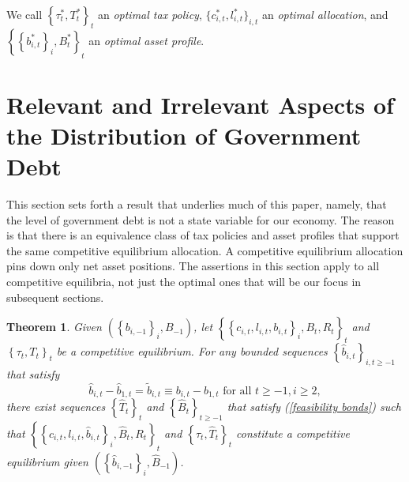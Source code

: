 \documentclass[thmsb,11pt]{article}
\newtheorem{theorem}{Theorem}
\begin{document}
\smallskip We  call $\left \{ \tau _{t}^{\ast },T_{t}^{\ast }\right \}
_{t}$ an \textit{optimal tax policy}, $\{c_{i,t}^{\ast },l_{i,t}^{\ast
}\}_{i,t}$ an \textit{optimal allocation}, and $\left \{ \left \{
b_{i,t}^{\ast }\right \} _{i},B_{t}^{\ast }\right \} _{t}$ an \textit{%
optimal asset profile}.

\section{\protect\smallskip Relevant and Irrelevant Aspects of  the Distribution of Government Debt\label{sec:Ricardian101}}
%
This section sets forth  a  result that underlies much of this paper, namely, that  the level
of government debt is not a state variable for our economy.  The reason is that there is an equivalence class of tax policies and asset profiles that support the same competitive equilibrium allocation.
A competitive  equilibrium allocation pins down only net asset  positions.
The assertions in this section apply to all competitive equilibria, not just the optimal ones that will be our focus in subsequent sections.


\begin{theorem}
\label{theorem: main} Given $\left( \left \{ b_{i,-1}\right \}
_{i},B_{-1}\right) $, let $\left \{ \left \{ c_{i,t},l_{i,t},b_{i,t}\right \} _{i},B_{t},R_{t}\right \} _{t} $ and $\left \{ \tau _{t},T_{t}\right
\} _{t}$ be a competitive equilibrium. For any bounded sequences $%
\left \{ \hat{b}_{i,t}\right \} _{i,t\geq -1}$ that satisfy
\begin{equation*}
\hat{b}_{i,t}-\hat{b}_{1,t}=\tilde{b}_{i,t}\equiv b_{i,t}	-b_{1,t}\text{ for all }t\geq -1,i\geq 2,
\end{equation*}%
there exist  sequences $\left \{ \hat{T}_{t}\right \} _{t}$ and $%
\left \{ \hat{B}_{t}\right \} _{t\geq -1}$ that satisfy (\ref{feasibility
bonds}) such that $\left \{ \left \{ c_{i,t},l_{i,t},\hat{b}%
_{i,t}\right \} _{i},\hat{B}_{t},R_{t}\right \} _{t}$ and $\left \{
\tau _{t},\hat{T}_{t}\right \} _{t}$ constitute a competitive
equilibrium given $\left( \left \{ \hat{b}_{i,-1}\right \} _{i},\hat{B}%
_{-1}\right) $.
\end{theorem}
\end{document}
